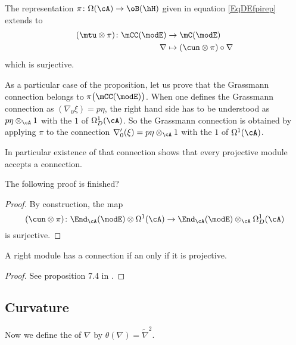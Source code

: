 \begin{proposition}\label{PropmCCmCsurjun}
	The representation $\pi\colon \Omega(\cA)\to \oB(\hH)$ given in equation \eqref{EqDEfpirep} extends to
	\begin{equation}
		\begin{aligned}
			(\mtu\otimes\pi)\colon \mCC(\modE) & \to \mC(\modE)                      \\
			\nabla                             & \mapsto (\cun\otimes\pi)\circ\nabla
		\end{aligned}
	\end{equation}
	which is surjective.
\end{proposition}
As a particular case of the proposition, let us prove that the Grassmann connection belongs to $\pi\big( \mCC(\modE) \big)$. When one defines the Grassmann connection as $(\nabla_0\xi)=p\eta$, the right hand side has to be understood as $p\eta\otimes_{\cA}1$ with the $1$ of $\Omega^1_D(\cA)$. So the Grassmann connection is obtained by applying $\pi$ to the connection $\nabla_0'(\xi)=p\eta\otimes_{\cA}1$ with the $1$ of $\Omega^1(\cA)$.

In particular existence of that connection shows that every projective module accepts a connection.
\begin{probleme}
	The following proof is finished?
\end{probleme}

\begin{proof}

	By construction, the map
	\[
		(\cun\otimes\pi)  \colon \End_{\cA}(\modE)\otimes\Omega^1(\cA)\to \End_{\cA}(\modE)\otimes_{\cA}\Omega_D^1(\cA)
	\]
	is surjective.


\end{proof}

\begin{proposition}
	A right module has a connection if an only if it is projective.
\end{proposition}

\begin{proof}
	See proposition 7.4 in \cite{Landi}.
\end{proof}


\subsection{Curvature}

Now we define the  of $\nabla$ by $\theta(\nabla)=\tilde\nabla^2$.

